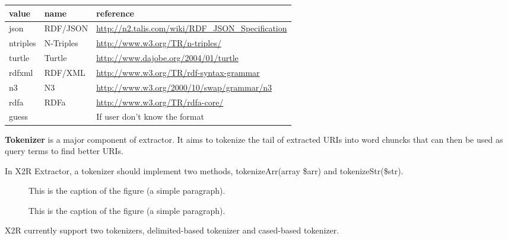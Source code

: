 \documentclass[letterpaper,10pt,english]{sphinxmanual}
\begin{document}
\begin{tabulary}{\linewidth}{|L|L|L|}
\hline
\textsf{\relax 
value
} & \textsf{\relax 
name
} & \textsf{\relax 
reference
}\\
\hline
json
 & 
RDF/JSON
 & 
\href{http://n2.talis.com/wiki/RDF\_JSON\_Specification}{http://n2.talis.com/wiki/RDF\_JSON\_Specification}
\\

ntriples
 & 
N-Triples
 & 
\href{http://www.w3.org/TR/n-triples/}{http://www.w3.org/TR/n-triples/}
\\

turtle
 & 
Turtle
 & 
\href{http://www.dajobe.org/2004/01/turtle}{http://www.dajobe.org/2004/01/turtle}
\\

rdfxml
 & 
RDF/XML
 & 
\href{http://www.w3.org/TR/rdf-syntax-grammar}{http://www.w3.org/TR/rdf-syntax-grammar}
\\

n3
 & 
N3
 & 
\href{http://www.w3.org/2000/10/swap/grammar/n3}{http://www.w3.org/2000/10/swap/grammar/n3}
\\

rdfa
 & 
RDFa
 & 
\href{http://www.w3.org/TR/rdfa-core/}{http://www.w3.org/TR/rdfa-core/}
\\

guess
 &  & 
If user don't know the format
\\
\hline\end{tabulary}


\textbf{Tokenizer} is a major component of extractor. It aims to tokenize the tail of extracted URIs into word chuncks that can then be used as query terms to find better URIs.

In X2R Extractor, a tokenizer should implement two methods, tokenizeArr(array \$arr) and tokenizeStr(\$str).
\begin{figure}[htbp]
\centering
\capstart

\caption{This is the caption of the figure (a simple paragraph).}\end{figure}
\begin{figure}[htbp]
\centering
\capstart

\caption{This is the caption of the figure (a simple paragraph).}\end{figure}

X2R currently support two tokenizers, delimited-based tokenizer and cased-based tokenizer.
\end{document}
